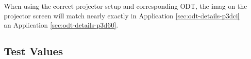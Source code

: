 When using the correct projector setup and corresponding ODT, the imag on the projector screen will match nearly exactly in Application \ref{sec:odt-details-p3dci} an Application \ref{sec:odt-details-p3d60}.


\subsection{Test Values}
\testValuesSubSec{}